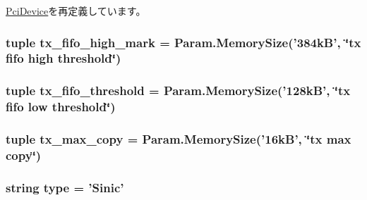 \hyperlink{classPci_1_1PciDevice_aa5dab65525a81097713cebf095217409}{PciDevice}を再定義しています。\hypertarget{classEthernet_1_1Sinic_afcd427b303218cd7a7e43fe6b721ac69}{
\subsubsection[{tx\_\-fifo\_\-high\_\-mark}]{\setlength{\rightskip}{0pt plus 5cm}tuple {\bf tx\_\-fifo\_\-high\_\-mark} = Param.MemorySize('384kB', \char`\"{}tx fifo high threshold\char`\"{})}}
\label{classEthernet_1_1Sinic_afcd427b303218cd7a7e43fe6b721ac69}
\hypertarget{classEthernet_1_1Sinic_a26d7dec83b183d15b11a068689e42480}{
\subsubsection[{tx\_\-fifo\_\-threshold}]{\setlength{\rightskip}{0pt plus 5cm}tuple {\bf tx\_\-fifo\_\-threshold} = Param.MemorySize('128kB', \char`\"{}tx fifo low threshold\char`\"{})}}
\label{classEthernet_1_1Sinic_a26d7dec83b183d15b11a068689e42480}
\hypertarget{classEthernet_1_1Sinic_a1a3bd8e55fed98a10a011cdea6330791}{
\subsubsection[{tx\_\-max\_\-copy}]{\setlength{\rightskip}{0pt plus 5cm}tuple {\bf tx\_\-max\_\-copy} = Param.MemorySize('16kB', \char`\"{}tx max copy\char`\"{})}}
\label{classEthernet_1_1Sinic_a1a3bd8e55fed98a10a011cdea6330791}
\hypertarget{classEthernet_1_1Sinic_acce15679d830831b0bbe8ebc2a60b2ca}{
\subsubsection[{type}]{\setlength{\rightskip}{0pt plus 5cm}string {\bf type} = '{\bf Sinic}'}}
\label{classEthernet_1_1Sinic_acce15679d830831b0bbe8ebc2a60b2ca}


